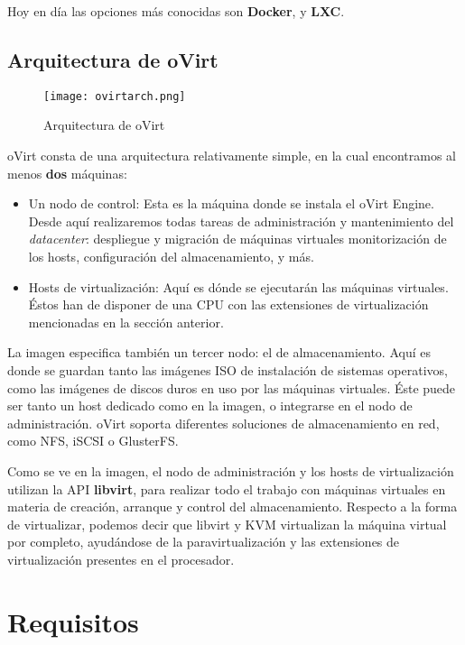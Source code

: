 Hoy en día las opciones más conocidas son \textbf{Docker}, y \textbf{LXC}.

\subsection{Arquitectura de oVirt}
\label{subsubsec:ovirt_arch}

\begin{figure}[ht!]
  \centering
  \texttt{[image: ovirtarch.png]}
  \caption{Arquitectura de oVirt}
\label{ovirtarch}
\end{figure}

oVirt consta de una arquitectura relativamente simple, en la cual encontramos al menos \textbf{dos} máquinas:

\begin{itemize}
    \item Un nodo de control: Esta es la máquina donde se instala el oVirt Engine. Desde aquí realizaremos todas tareas de administración y mantenimiento del \emph{datacenter}: despliegue y migración de máquinas virtuales monitorización de los hosts, configuración del almacenamiento, y más.

    \item Hosts de virtualización: Aquí es dónde se ejecutarán las máquinas virtuales. Éstos han de disponer de una CPU con las extensiones de virtualización mencionadas en la sección anterior.
\end{itemize}

La imagen especifica también un tercer nodo: el de almacenamiento. Aquí es donde se guardan tanto las imágenes ISO de instalación de sistemas operativos, como las imágenes de discos duros en uso por las máquinas virtuales. Éste puede ser tanto un host dedicado como en la imagen, o integrarse en el nodo de administración. oVirt soporta diferentes soluciones de almacenamiento en red, como NFS, iSCSI o GlusterFS.\@

Como se ve en la imagen, el nodo de administración y los hosts de virtualización utilizan la API \textbf{libvirt}, para realizar todo el trabajo con máquinas virtuales en materia de creación, arranque y control del almacenamiento. Respecto a la forma de virtualizar, podemos decir que libvirt y KVM virtualizan la máquina virtual por completo, ayudándose de la paravirtualización y las extensiones de virtualización presentes en el procesador.

\section{Requisitos}
\label{subsec:requisitios}

